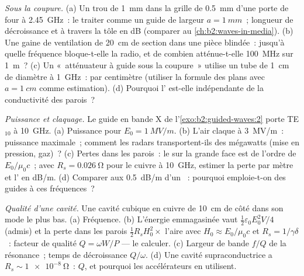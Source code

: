 \begin{exercise}[$\star\star$]\label{exo:b2:guided-waves:6}
\emph{Sous la coupure.} (a) Un trou de \qty{1}{mm} dans la grille de \qty{0.5}{mm} d'une
porte de four à \qty{2.45}{GHz}~: le traiter comme un guide de largeur $a = \qty{1}{mm}$~;
longueur de décroissance et  à travers la tôle en dB (comparer au
\cref{ch:b2:waves-in-media}). (b) Une gaine de ventilation de \qty{20}{cm} de
section dans une pièce blindée~: jusqu'à quelle fréquence bloque-t-elle la radio,
et de combien atténue-t-elle \qty{100}{MHz} sur \qty{1}{m}~? (c) Un
«~atténuateur à guide sous la coupure~» utilise un tube de \qty{1}{cm} de diamètre à
\qty{1}{GHz}~:  par centimètre (utiliser la formule des plans avec $a =
\qty{1}{cm}$ comme estimation). (d) Pourquoi l' est-elle indépendante de
la conductivité des parois~?
\end{exercise}

\begin{exercise}[$\star\star$]\label{exo:b2:guided-waves:7}
\emph{Puissance et claquage.} Le guide en bande X de l'\cref{exo:b2:guided-waves:2}
porte TE$_{10}$ à \qty{10}{GHz}. (a) Puissance pour $E_0 = \qty{1}{MV/m}$. (b) L'air
claque à \qty{3}{MV/m}~: puissance maximale~; comment les radars transportent-ils des
mégawatts (mise en pression, gaz)~? (c) Pertes dans les parois~: le 
sur la grande face est de l'ordre de $E_0/\mu_0c$~; avec $R_s = \qty{0.026}{\ohm}$ pour
le cuivre à \qty{10}{GHz}, estimer la perte par mètre et l'
en dB/m. (d) Comparer aux \qty{0.5}{dB/m} d'un ~: pourquoi
emploie-t-on des guides à ces fréquences~?
\end{exercise}

\begin{exercise}[$\star\star$]\label{exo:b2:guided-waves:8}
\emph{Qualité d'une cavité.} Une cavité cubique en cuivre de \qty{10}{cm} de côté dans son
mode le plus bas. (a) Fréquence. (b) L'énergie emmagasinée vaut $\tfrac12\varepsilon_0E_0^2V/4$
(admis) et la perte dans les parois $\tfrac12R_sH_0^2\times$ l'aire avec $H_0 \approx E_0/
\mu_0c$ et $R_s = 1/\gamma\delta$~: facteur de qualité $Q = \omega W/P$ --- le calculer.
(c) Largeur de bande $f/Q$ de la résonance~; temps de décroissance $Q/\omega$. (d) Une
cavité supraconductrice a $R_s \sim \qty{1e-8}{\ohm}$~: $Q$, et pourquoi les
accélérateurs en utilisent.
\end{exercise}

